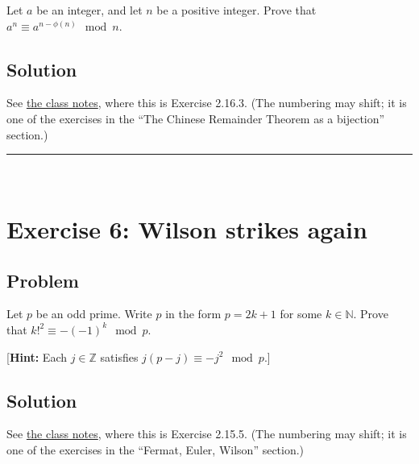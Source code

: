 \documentclass[paper=a4, fontsize=12pt]{scrartcl}%
\theoremstyle{plainsl}
\theoremstyle{definition}
\theoremstyle{remark}
\begin{document}
Let $a$ be an integer, and let $n$ be a positive integer. Prove that $a^{n}
\equiv a^{n - \phi\left(  n \right)  } \mod n$.

\subsection{Solution}

See \href{http://www.cip.ifi.lmu.de/~grinberg/t/19s/notes.pdf}{the class
notes}, where this is Exercise 2.16.3. (The numbering may shift; it is one of
the exercises in the ``The Chinese Remainder Theorem as a bijection'' section.)



\rule{\linewidth}{0.3pt} \\[0.4cm]

\section{Exercise 6: Wilson strikes again}

\subsection{Problem}

Let $p$ be an odd prime. Write $p$ in the form $p = 2k+1$ for some $k
\in\mathbb{N}$. Prove that $k!^{2} \equiv- \left(  -1 \right)  ^{k} \mod p$.

[\textbf{Hint:} Each $j \in\mathbb{Z}$ satisfies $j \left(  p-j \right)
\equiv-j^{2} \mod p$.]

\subsection{Solution}

See \href{http://www.cip.ifi.lmu.de/~grinberg/t/19s/notes.pdf}{the class
notes}, where this is Exercise 2.15.5. (The numbering may shift; it is one of
the exercises in the ``Fermat, Euler, Wilson'' section.)
\end{document}
